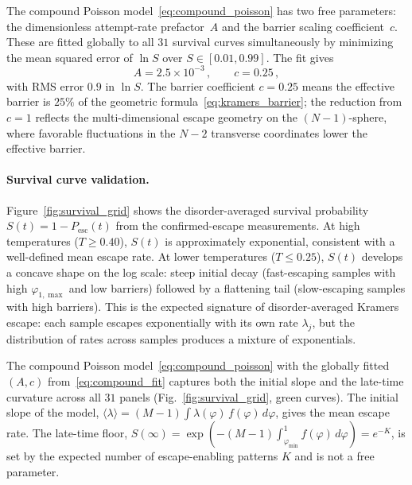 \documentclass[11pt]{article}
\begin{document}
The compound Poisson model~\eqref{eq:compound_poisson} has two free parameters: the dimensionless attempt-rate prefactor~$A$ and the barrier scaling coefficient~$c$.  These are fitted globally to all $31$ survival curves simultaneously by minimizing the mean squared error of $\ln S$ over $S \in [0.01, 0.99]$.  The fit gives
\begin{equation}
A = 2.5 \times 10^{-3}\,, \qquad c = 0.25\,,
\label{eq:compound_fit}
\end{equation}
with RMS error $0.9$ in $\ln S$.  The barrier coefficient $c = 0.25$ means the effective barrier is $25\%$ of the geometric formula~\eqref{eq:kramers_barrier}; the reduction from $c = 1$ reflects the multi-dimensional escape geometry on the $(N{-}1)$-sphere, where favorable fluctuations in the $N-2$ transverse coordinates lower the effective barrier.

\paragraph{Survival curve validation.}
Figure~\ref{fig:survival_grid} shows the disorder-averaged survival probability $S(t) = 1 - P_{\mathrm{esc}}(t)$ from the confirmed-escape measurements.  At high temperatures ($T \geq 0.40$), $S(t)$ is approximately exponential, consistent with a well-defined mean escape rate.  At lower temperatures ($T \leq 0.25$), $S(t)$ develops a concave shape on the log scale: steep initial decay (fast-escaping samples with high $\varphi_{1,\max}$ and low barriers) followed by a flattening tail (slow-escaping samples with high barriers).  This is the expected signature of disorder-averaged Kramers escape: each sample escapes exponentially with its own rate $\lambda_j$, but the distribution of rates across samples produces a mixture of exponentials.

The compound Poisson model~\eqref{eq:compound_poisson} with the globally fitted $(A, c)$ from~\eqref{eq:compound_fit} captures both the initial slope and the late-time curvature across all $31$ panels (Fig.~\ref{fig:survival_grid}, green curves).  The initial slope of the model, $\langle\lambda\rangle = (M{-}1)\int \lambda(\varphi)\,f(\varphi)\,d\varphi$, gives the mean escape rate.  The late-time floor, $S(\infty) = \exp(-(M{-}1)\int_{\varphi_{\min}}^1 f(\varphi)\,d\varphi) = e^{-K}$, is set by the expected number of escape-enabling patterns $K$ and is not a free parameter.
\end{document}
